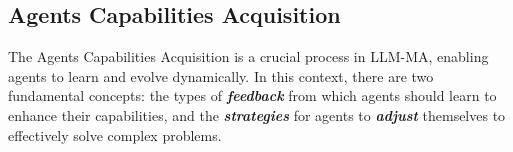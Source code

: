 

\subsection{Agents Capabilities Acquisition}
The Agents Capabilities Acquisition is a crucial process in LLM-MA, enabling agents to learn and evolve dynamically. In this context, there are two fundamental concepts: the types of \emph{\textbf{feedback}} from which agents should learn to enhance their capabilities,  and the \emph{\textbf{strategies}} for agents to \emph{\textbf{adjust}} themselves to effectively solve complex problems. 
